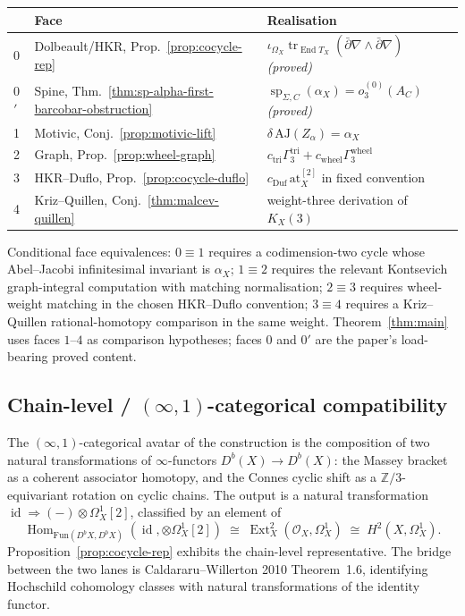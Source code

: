 \documentclass[11pt,reqno]{amsart}
\theoremstyle{plain}
\theoremstyle{definition}
\theoremstyle{remark}
\DeclareMathOperator{\Ext}{Ext}
\DeclareMathOperator{\Hom}{Hom}
\DeclareMathOperator{\End}{End}
\DeclareMathOperator{\tr}{tr}
\DeclareMathOperator{\id}{id}
\newcommand{\Zbb}{\mathbb{Z}}
\newcommand{\cO}{\mathcal{O}}
\newcommand{\at}{\mathrm{at}}
\begin{document}
\begin{center}
\begin{tabular}{lll}
\toprule
 & Face & Realisation \\
\midrule
0 & Dolbeault/HKR, Prop.~\ref{prop:cocycle-rep} &
  $\iota_{\Omega_X}\tr_{\End T_X}(\bar\partial\nabla\wedge\bar\partial\nabla)$
  \emph{(proved)} \\
0$'$ & Spine, Thm.~\ref{thm:sp-alpha-first-barcobar-obstruction} &
  $\operatorname{sp}_{\Sigma,C}(\alpha_X)=o^{(0)}_3(A_C)$
  \emph{(proved)} \\
1 & Motivic, Conj.~\ref{prop:motivic-lift} & $\delta\,\mathrm{AJ}(Z_\alpha)=\alpha_X$ \\
2 & Graph, Prop.~\ref{prop:wheel-graph} & $c_{\mathrm{tri}}\Gamma_3^{\mathrm{tri}} + c_{\mathrm{wheel}}\Gamma_3^{\mathrm{wheel}}$ \\
3 & HKR--Duflo, Prop.~\ref{prop:cocycle-duflo} & $c_{\mathrm{Duf}}\,\at_X^{[2]}$ in fixed convention \\
4 & Kriz--Quillen, Conj.~\ref{thm:malcev-quillen} & weight-three derivation of $K_X(3)$ \\
\bottomrule
\end{tabular}
\end{center}

Conditional face equivalences: $0\equiv 1$ requires a codimension-two
cycle whose Abel--Jacobi infinitesimal invariant is $\alpha_X$;
$1\equiv 2$ requires the relevant Kontsevich graph-integral computation
with matching normalisation; $2\equiv 3$ requires wheel-weight matching
in the chosen HKR--Duflo convention; $3\equiv 4$ requires a
Kriz--Quillen rational-homotopy comparison in the same weight.
Theorem~\ref{thm:main} uses faces $1$--$4$ as comparison hypotheses;
faces $0$ and $0'$ are the paper's load-bearing proved content.

\subsection{Chain-level / $(\infty,1)$-categorical compatibility}
The $(\infty,1)$-categorical avatar of the construction is the composition of two natural transformations of $\infty$-functors $D^b(X) \to D^b(X)$: the Massey bracket as a coherent associator homotopy, and the Connes cyclic shift as a $\Zbb/3$-equivariant rotation on cyclic chains. The output is a natural transformation $\id \Rightarrow (-) \otimes \Omega^1_X[2]$, classified by an element of
\[
  \Hom_{\mathrm{Fun}(D^b X, D^b X)}(\id, \otimes \Omega^1_X[2]) \;\cong\; \Ext^2_X(\cO_X, \Omega^1_X) \;\cong\; H^2(X, \Omega^1_X).
\]
Proposition~\ref{prop:cocycle-rep} exhibits the chain-level representative. The bridge between the two lanes is Caldararu--Willerton 2010 Theorem~1.6, identifying Hochschild cohomology classes with natural transformations of the identity functor.
\end{document}
